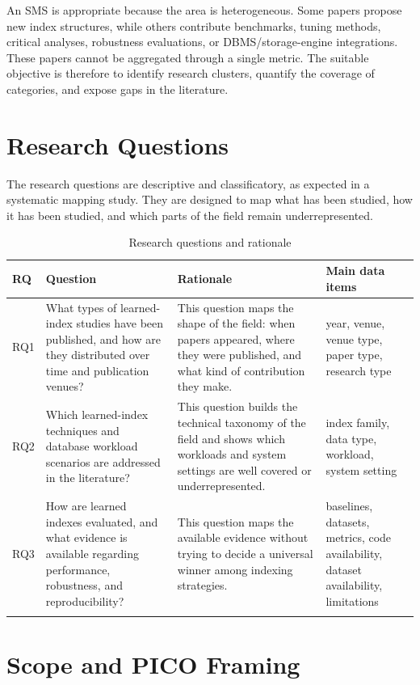 \documentclass[a4paper, 12pt, twoside]{report}
\begin{document}
An SMS is appropriate because the area is heterogeneous. Some papers propose new index structures, while others contribute benchmarks, tuning methods, critical analyses, robustness evaluations, or DBMS/storage-engine integrations. These papers cannot be aggregated through a single metric. The suitable objective is therefore to identify research clusters, quantify the coverage of categories, and expose gaps in the literature.

\newpage
\section{Research Questions}

The research questions are descriptive and classificatory, as expected in a systematic mapping study. They are designed to map what has been studied, how it has been studied, and which parts of the field remain underrepresented.

\begin{longtable}{|p{1.1cm}|p{4.7cm}|p{4.6cm}|p{2.2cm}|}
\hline
\textbf{RQ} & \textbf{Question} & \textbf{Rationale} & \textbf{Main data items} \\
\hline
RQ1 & What types of learned-index studies have been published, and how are they distributed over time and publication venues? & This question maps the shape of the field: when papers appeared, where they were published, and what kind of contribution they make. & year, venue, venue type, paper type, research type \\
\hline
RQ2 & Which learned-index techniques and database workload scenarios are addressed in the literature? & This question builds the technical taxonomy of the field and shows which workloads and system settings are well covered or underrepresented. & index family, data type, workload, system setting \\
\hline
RQ3 & How are learned indexes evaluated, and what evidence is available regarding performance, robustness, and reproducibility? & This question maps the available evidence without trying to decide a universal winner among indexing strategies. & baselines, datasets, metrics, code availability, dataset availability, limitations \\
\hline
\caption{Research questions and rationale}
\label{tab:rq-rationale}
\end{longtable}

\section{Scope and PICO Framing}
\end{document}
